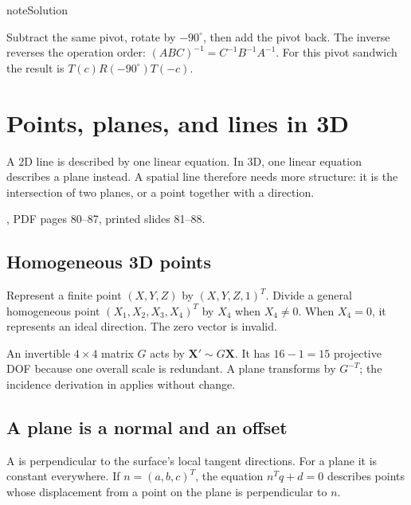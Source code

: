 \documentclass[letterpaper,11pt,english,openany,oneside]{jupyterBook}
\begin{document}
\begin{sphinxadmonition}{note}{Solution}

\sphinxAtStartPar
Subtract the same pivot, rotate by \(-90^\circ\), then add the pivot back. The inverse reverses the operation order: \((ABC)^{-1}=C^{-1}B^{-1}A^{-1}\). For this pivot sandwich the result is \(T(c)R(-90^\circ)T(-c)\).
\end{sphinxadmonition}

\sphinxstepscope


\section{Points, planes, and lines in 3D}
\label{\detokenize{lectures/lecture01/planes-lines:points-planes-and-lines-in-3d}}\label{\detokenize{lectures/lecture01/planes-lines:lec01-planes}}\label{\detokenize{lectures/lecture01/planes-lines::doc}}
\sphinxAtStartPar
A 2D line is described by one linear equation. In 3D, one linear equation describes a plane instead. A spatial line therefore needs more structure: it is the intersection of two planes, or a point together with a direction.

\sphinxAtStartPar
{} , PDF pages 80–87, printed slides 81–88.


\subsection{Homogeneous 3D points}
\label{\detokenize{lectures/lecture01/planes-lines:homogeneous-3d-points}}
\sphinxAtStartPar
Represent a finite point \((X,Y,Z)\) by \((X,Y,Z,1)^T\). Divide a general homogeneous point \((X_1,X_2,X_3,X_4)^T\) by \(X_4\) when \(X_4\ne0\). When \(X_4=0\), it represents an ideal direction. The zero vector is invalid.

\sphinxAtStartPar
An invertible \(4\times4\) matrix \(G\) acts by \(\mathbf{X}'\sim G\mathbf{X}\). It has \(16-1=15\) projective DOF because one overall scale is redundant. A plane transforms by \(G^{-T}\); the incidence derivation in {\hyperref[\detokenize{lectures/lecture01/transformations:lec01-transformations}]{}} applies without change.


\subsection{A plane is a normal and an offset}
\label{\detokenize{lectures/lecture01/planes-lines:a-plane-is-a-normal-and-an-offset}}
\sphinxAtStartPar
A  is perpendicular to the surface’s local tangent directions. For a plane it is constant everywhere. If \(n=(a,b,c)^T\), the equation \(n^Tq+d=0\) describes points whose displacement from a point on the plane is perpendicular to \(n\).
\end{document}

